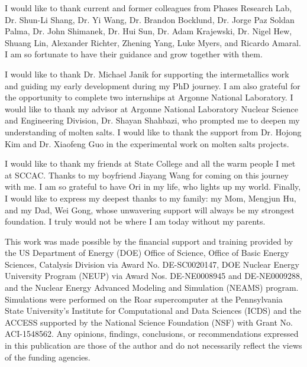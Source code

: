 \documentclass[letterpaper, 12pt]{report}
\begin{document}
I would like to thank current and former colleagues from Phases Research Lab, Dr. Shun-Li Shang, Dr. Yi Wang, Dr. Brandon Bocklund, Dr. Jorge Paz Soldan Palma, Dr. John Shimanek, Dr. Hui Sun, Dr. Adam Krajewski, Dr. Nigel Hew, Shuang Lin, Alexander Richter, Zhening Yang, Luke Myers, and Ricardo Amaral. I am so fortunate to have their guidance and grow together with them.

I would like to thank Dr. Michael Janik for supporting the intermetallics work and guiding my early development during my PhD journey. I am also grateful for the opportunity to complete two internships at Argonne National Laboratory. I would like to thank my advisor at Argonne National Laboratory Nuclear Science and Engineering Division, Dr. Shayan Shahbazi, who prompted me to deepen my understanding of molten salts. I would like to thank the support from Dr. Hojong Kim and Dr. Xiaofeng Guo in the experimental work on molten salts projects.

I would like to thank my friends at State College and all the warm people I met at SCCAC. Thanks to my boyfriend Jiayang Wang for coming on this journey with me. I am so grateful to have Ori in my life, who lights up my world. Finally, I would like to express my deepest thanks to my family: my Mom, Mengjun Hu, and my Dad, Wei Gong, whose unwavering support will always be my strongest foundation. I truly would not be where I am today without my parents.

This work was made possible by the financial support and training provided by the US Department of Energy (DOE) Office of Science, Office of Basic Energy Sciences, Catalysis Division via Award No. DE-SC0020147, DOE Nuclear Energy University Program (NEUP) via Award Nos. DE-NE0008945 and DE-NE0009288, and the Nuclear Energy Advanced Modeling and Simulation (NEAMS) program. Simulations were performed on the Roar supercomputer at the Pennsylvania State University's Institute for Computational and Data Sciences (ICDS) and the ACCESS supported by the National Science Foundation (NSF) with Grant No. ACI-1548562. Any opinions, findings, conclusions, or recommendations expressed in this publication are those of the author and do not necessarily reflect the views of the funding agencies.


\newpage
\setlength\parindent{2em} %


\end{document}
